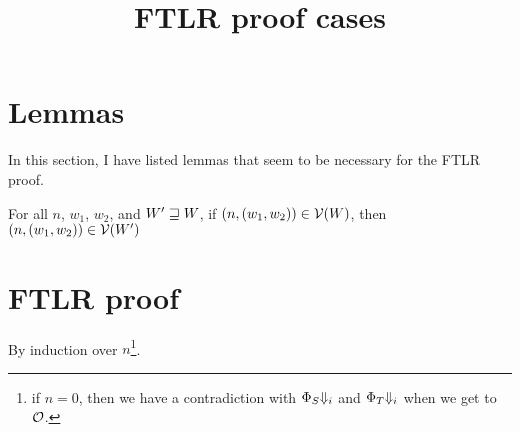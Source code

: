 \documentclass[a4paper]{article}
\title{FTLR proof cases}
\begin{document}
\maketitle
\section{Lemmas}
In this section, I have listed lemmas that seem to be necessary for the FTLR proof.
\begin{lemma}
  For all $n$, $w_1$, $w_2$, and $W' \future W$, if $\npair{(w_1,w_2)} \in \lrv(W)$, then $\npair{(w_1,w_2)} \in \lrv(W')$
\end{lemma}

\section{FTLR proof}
By induction over $n$\footnote{if $n=0$, then we have a contradiction with $\Phi_S\term[i]$ and $\Phi_T\term[i]$ when we get to $\lro$.}.
\end{document}
